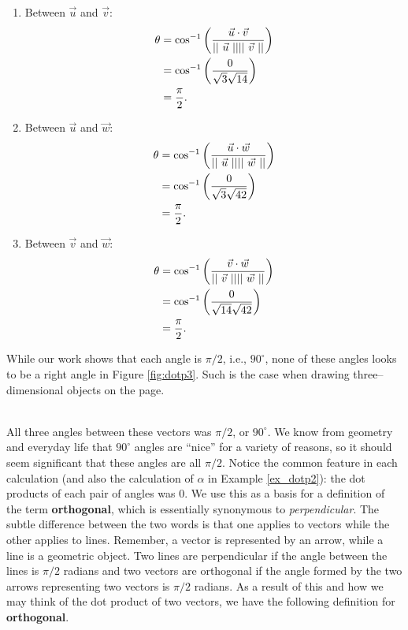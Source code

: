 %
{\begin{enumerate}
	\item Between $\vec u$ and $\vec v$:
	\begin{align*}
	\theta &= \cos^{-1}\left(\frac{\vec u \cdot \vec v}{||\ \vec u\ ||||\ \vec v\ ||}\right)\\
					&= \cos^{-1}\left(\frac{0}{\sqrt{3}\sqrt{14}}\right)\\
					&= \frac{\pi}2.
	\end{align*}
	\item	Between $\vec u$ and $\vec w$:
	\begin{align*}
	\theta &= \cos^{-1}\left(\frac{\vec u \cdot \vec w}{||\ \vec u\ ||||\ \vec w\ ||}\right)\\
					&= \cos^{-1}\left(\frac{0}{\sqrt{3}\sqrt{42}}\right)\\
					&= \frac{\pi}2.
	\end{align*}
	\item	Between $\vec v$ and $\vec w$:
	\begin{align*}
	\theta &= \cos^{-1}\left(\frac{\vec v \cdot \vec w}{||\ \vec v\ ||||\ \vec w\ ||}\right)\\
					&= \cos^{-1}\left(\frac{0}{\sqrt{14}\sqrt{42}}\right)\\
					&= \frac{\pi}2.
	\end{align*}
\end{enumerate}
While our work shows that each angle is $\pi/2$, i.e.,  $90^\circ$, none of these angles looks to be a right angle in Figure \ref{fig:dotp3}. Such is the case when drawing three--dimensional objects on the page.
}\\

All three angles between these vectors was $\pi/2$, or $90^\circ$. We know from geometry and everyday life that $90^\circ$ angles are ``nice'' for a variety of reasons, so it should seem significant that these angles are all $\pi/2$. Notice the common feature in each calculation (and also the calculation of $\alpha$ in Example \ref{ex_dotp2}): the dot products of each pair of angles was 0. We use this as a basis for a definition of the term \textbf{orthogonal}, which is essentially synonymous to \textit{perpendicular}.  The subtle difference between the two words is that one applies to vectors while the other applies to lines.  Remember, a vector is represented by an arrow, while a line is a geometric object.  Two lines are perpendicular if the angle between the lines is $\pi/2$ radians and two vectors are orthogonal if the angle formed by the two arrows representing two vectors is $\pi/2$ radians.  As a result of this and how we may think of the dot product of two vectors, we have the following definition for \textbf{orthogonal}.

